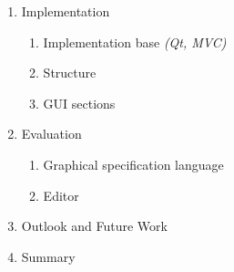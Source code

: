 \documentclass[12pt,a4paper]{article}
\newenvironment{redtext}{\color{gray} \it{}}{\ignorespacesafterend}
\begin{document}
\begin{enumerate}[noitemsep]
      \item Implementation
  \begin{enumerate}[noitemsep]
         \item Implementation base \begin{redtext}(Qt, MVC)\end{redtext}
         \item Structure
         \item GUI sections
      \end{enumerate}
      \item Evaluation
  \begin{enumerate}[noitemsep]
         \item Graphical specification language
         \item Editor
      \end{enumerate}
      \item Outlook and Future Work
	\item Summary
   \end{enumerate}
   
\end{document}
